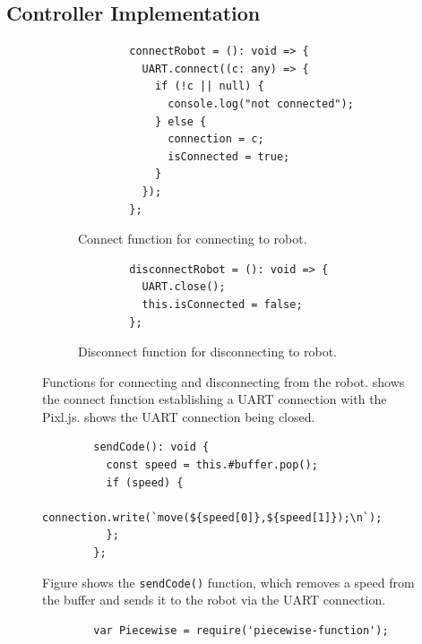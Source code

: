 \documentclass{l4proj}
\begin{document}
\begin{appendices}
\chapter{Controller Implementation}
\begin{figure}[!h]
    \centering
    \begin{subfigure}{0.49\textwidth}
        \begin{lstlisting}
        connectRobot = (): void => {
          UART.connect((c: any) => {
            if (!c || null) {
              console.log("not connected");
            } else {
              connection = c;
              isConnected = true;
            }
          });
        };
        \end{lstlisting}
    \caption{Connect function for connecting to robot.}
    \label{lst:connect-func}
    \end{subfigure}
    \begin{subfigure}{0.49\textwidth}
        \begin{lstlisting}
        disconnectRobot = (): void => {
          UART.close();
          this.isConnected = false;
        };
        \end{lstlisting}
    \caption{Disconnect function for disconnecting to robot.}
    \label{lst:disconnect-func}
    \end{subfigure}
    \caption{Functions for connecting and disconnecting from the robot.  shows the connect function establishing a UART connection with the Pixl.js.  shows the UART connection being closed.}
    \label{lst:connection-funcs}
\end{figure}


\begin{figure}[!h]
    \centering
        \begin{lstlisting}
        sendCode(): void {
          const speed = this.#buffer.pop();
          if (speed) {
            connection.write(`move(${speed[0]},${speed[1]});\n`);
          };
        };
        \end{lstlisting}
    \caption{Figure shows the \lstinline{sendCode()} function, which removes a speed from the buffer and sends it to the robot via the UART connection.}
    \label{lst:send-code}
\end{figure}


\begin{figure}[!h]
    \centering
        \begin{lstlisting}
        var Piecewise = require('piecewise-function');


\end{lstlisting}
\end{figure}
\end{appendices}
\end{document}

